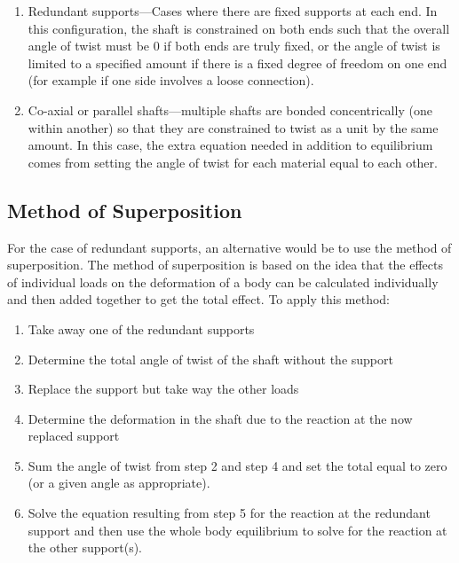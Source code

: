 \documentclass[
  letterpaper,
  DIV=11,
  numbers=noendperiod]{scrreprt}
\providecommand{\tightlist}{%
  \setlength{\itemsep}{0pt}\setlength{\parskip}{0pt}}\usepackage{longtable,booktabs,array}
\theoremstyle{definition}
\theoremstyle{remark}
\begin{document}
\begin{enumerate}
\def\labelenumi{\arabic{enumi}.}
\item
  Redundant supports---Cases where there are fixed supports at each end.
  In this configuration, the shaft is constrained on both ends such that
  the overall angle of twist must be 0 if both ends are truly fixed, or
  the angle of twist is limited to a specified amount if there is a
  fixed degree of freedom on one end (for example if one side involves a
  loose connection).
\item
  Co-axial or parallel shafts---multiple shafts are bonded
  concentrically (one within another) so that they are constrained to
  twist as a unit by the same amount. In this case, the extra equation
  needed in addition to equilibrium comes from setting the angle of
  twist for each material equal to each other.
\end{enumerate}

\subsection{Method of Superposition}\label{method-of-superposition}

For the case of redundant supports, an alternative would be to use the
method of superposition. The method of superposition is based on the
idea that the effects of individual loads on the deformation of a body
can be calculated individually and then added together to get the total
effect. To apply this method:

\begin{enumerate}
\def\labelenumi{\arabic{enumi}.}
\tightlist
\item
  Take away one of the redundant supports
\item
  Determine the total angle of twist of the shaft without the support
\item
  Replace the support but take way the other loads
\item
  Determine the deformation in the shaft due to the reaction at the now
  replaced support
\item
  Sum the angle of twist from step 2 and step 4 and set the total equal
  to zero (or a given angle as appropriate).
\item
  Solve the equation resulting from step 5 for the reaction at the
  redundant support and then use the whole body equilibrium to solve for
  the reaction at the other support(s).
\end{enumerate}
\end{document}
